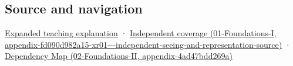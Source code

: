 \subsection{Source and navigation}\label{appendix-7281c15ac44a-source-and-navigation}

\hyperref[04-visual-computing-ii-ch042-the-eye-is-an-optical-instrument-with-neural-processing-inside-it]{Expanded teaching explanation} · \href{../01-Foundations-I/main.pdf\#nameddest=appendix-fd090d982a15-xr01---independent-seeing-and-representation-source}{Independent coverage (01-Foundations-I, appendix-fd090d982a15-xr01-\/-\/-independent-seeing-and-representation-source)} · \href{../02-Foundations-II/main.pdf\#nameddest=appendix-4ad47bdd269a}{Dependency Map (02-Foundations-II, appendix-4ad47bdd269a)}
